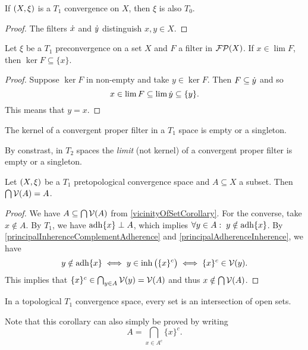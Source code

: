 \begin{lemma}
If $\left( X,\xi \right)$ is a $T_1$ convergence on $X$, then $\xi$ is also $T_0$.
\end{lemma}
\begin{proof}
The filters $\dot{x}$ and $\dot{y}$ distinguish $x,y\in X$.
\end{proof}

\begin{proposition}
Let $\xi$ be a $T_1$ preconvergence on a set $X$ and $F$ a filter in $\operatorname{\mathcal{FP}}(X)$. If $x\in \lim F$, then $\ker F \subseteq \{x\}$.
\end{proposition}
\begin{proof}
Suppose $\ker F$ in non-empty and take $y \in \ker F$. Then $F \subseteq \dot{y}$ and so
\[ x \in \lim F \subseteq \lim \dot{y} \subseteq \{y\}. \]
This means that $y = x$.
\end{proof}
\begin{corollary}
The kernel of a convergent proper filter in a $T_1$ space is empty or a singleton.
\end{corollary}
By constrast, in $T_2$ spaces the \emph{limit} (not kernel) of a convergent proper filter is empty or a singleton.

\begin{proposition} \label{setKernelVicinityFilter}
Let $\left( X,\xi \right)$ be a $T_1$ pretopological convergence space and $A \subseteq X$ a subset. Then $\bigcap\operatorname{\mathcal{V}}(A) = A$.
\end{proposition}
\begin{proof}
We have $A\subseteq \bigcap\operatorname{\mathcal{V}}(A)$ from \ref{vicinityOfSetCorollary}. For the converse, take $x\notin A$. By $T_1$, we have $\operatorname{adh}\{x\} \perp A$, which implies $\forall y\in A:\; y\notin\operatorname{adh}\{x\}$. By \ref{principalInherenceComplementAdherence} and \ref{principalAdherenceInherence}, we have
\[ y\notin\operatorname{adh}\{x\} \iff y\in \operatorname{inh}\big(\{x\}^c\big) \iff \{x\}^c\in \operatorname{\mathcal{V}}(y). \]
This implies that $\{x\}^c \in \bigcap_{y\in A}\operatorname{\mathcal{V}}(y) = \operatorname{\mathcal{V}}(A)$ and thus $x\notin \bigcap\operatorname{\mathcal{V}}(A)$.
\end{proof}
\begin{corollary}
In a topological $T_1$ convergence space, every set is an intersection of open sets.
\end{corollary}
Note that this corollary can also simply be proved by writing
\[ A = \bigcap_{x\in A^c}\{x\}^c. \]

